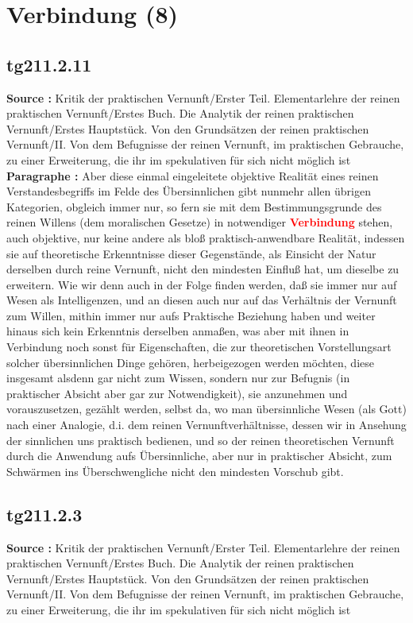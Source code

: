 \documentclass[a4paper,12pt,twoside]{book}
\newcommand{\match}[1]{\textcolor{red}{\textbf{#1}}}
\newcommand{\unnumberedsection}[1]{
	\section*{#1}
	\addcontentsline{toc}{section}{#1}
	\markright{#1}
}
\begin{document}
	\unnumberedsection{Verbindung (8)} 
	\subsection*{tg211.2.11} 
	\textbf{Source : }Kritik der praktischen Vernunft/Erster Teil. Elementarlehre der reinen praktischen Vernunft/Erstes Buch. Die Analytik der reinen praktischen Vernunft/Erstes Hauptstück. Von den Grundsätzen der reinen praktischen Vernunft/II. Von dem Befugnisse der reinen Vernunft, im praktischen Gebrauche, zu einer Erweiterung, die ihr im spekulativen für sich nicht möglich ist\\  
	
	\noindent\textbf{Paragraphe : }Aber diese einmal eingeleitete objektive Realität eines reinen Verstandesbegriffs im Felde des Übersinnlichen gibt nunmehr allen übrigen Kategorien, obgleich immer nur, so fern sie mit dem Bestimmungsgrunde des reinen Willens (dem moralischen Gesetze) in notwendiger \match{Verbindung} stehen, auch objektive, nur keine andere als bloß praktisch-anwendbare Realität, indessen sie auf theoretische Erkenntnisse dieser Gegenstände, als Einsicht der Natur derselben durch reine Vernunft, nicht den mindesten Einfluß hat, um dieselbe zu erweitern. Wie wir denn auch in der Folge finden werden, daß sie immer nur auf Wesen als Intelligenzen, und an diesen auch nur auf das Verhältnis der Vernunft zum Willen, mithin immer nur aufs Praktische Beziehung haben und weiter hinaus sich kein Erkenntnis derselben anmaßen, was aber mit ihnen in Verbindung noch sonst für Eigenschaften, die zur theoretischen Vorstellungsart solcher übersinnlichen Dinge gehören, herbeigezogen werden möchten, diese insgesamt alsdenn gar nicht zum Wissen, sondern nur zur Befugnis (in praktischer Absicht aber gar zur Notwendigkeit), sie anzunehmen und vorauszusetzen, gezählt werden, selbst da, wo man übersinnliche Wesen (als Gott) nach einer Analogie, d.i. dem reinen Vernunftverhältnisse, dessen wir in Ansehung der sinnlichen uns praktisch bedienen, und so der reinen theoretischen Vernunft durch die Anwendung aufs Übersinnliche, aber nur in praktischer Absicht, zum Schwärmen ins Überschwengliche nicht den mindesten Vorschub gibt. 
	
	\subsection*{tg211.2.3} 
	\textbf{Source : }Kritik der praktischen Vernunft/Erster Teil. Elementarlehre der reinen praktischen Vernunft/Erstes Buch. Die Analytik der reinen praktischen Vernunft/Erstes Hauptstück. Von den Grundsätzen der reinen praktischen Vernunft/II. Von dem Befugnisse der reinen Vernunft, im praktischen Gebrauche, zu einer Erweiterung, die ihr im spekulativen für sich nicht möglich ist\\  
	
\end{document}
